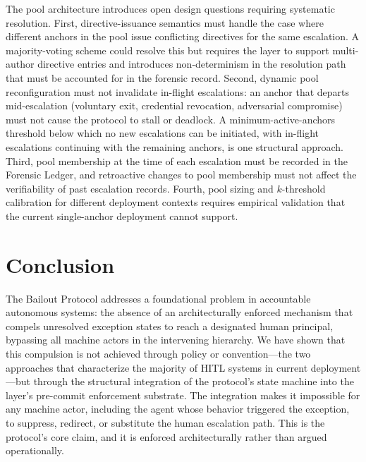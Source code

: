The pool architecture introduces open design questions requiring systematic resolution. First, directive-issuance semantics must handle the case where different anchors in the pool issue conflicting directives for the same escalation. A majority-voting scheme could resolve this but requires the \fact{} layer to support multi-author directive entries and introduces non-determinism in the resolution path that must be accounted for in the forensic record. Second, dynamic pool reconfiguration must not invalidate in-flight escalations: an anchor that departs mid-escalation (voluntary exit, credential revocation, adversarial compromise) must not cause the protocol to stall or deadlock. A minimum-active-anchors threshold below which no new escalations can be initiated, with in-flight escalations continuing with the remaining anchors, is one structural approach. Third, pool membership at the time of each escalation must be recorded in the Forensic Ledger, and retroactive changes to pool membership must not affect the verifiability of past escalation records. Fourth, pool sizing and $k$-threshold calibration for different deployment contexts requires empirical validation that the current single-anchor deployment cannot support.

\section{Conclusion}\label{sec:conclusion}

The Bailout Protocol addresses a foundational problem in accountable autonomous systems: the absence of an architecturally enforced mechanism that compels unresolved exception states to reach a designated human principal, bypassing all machine actors in the intervening hierarchy. We have shown that this compulsion is not achieved through policy or convention---the two approaches that characterize the majority of HITL systems in current deployment---but through the structural integration of the protocol's state machine into the \fact{} layer's pre-commit enforcement substrate. The integration makes it impossible for any machine actor, including the agent whose behavior triggered the exception, to suppress, redirect, or substitute the human escalation path. This is the protocol's core claim, and it is enforced architecturally rather than argued operationally.

